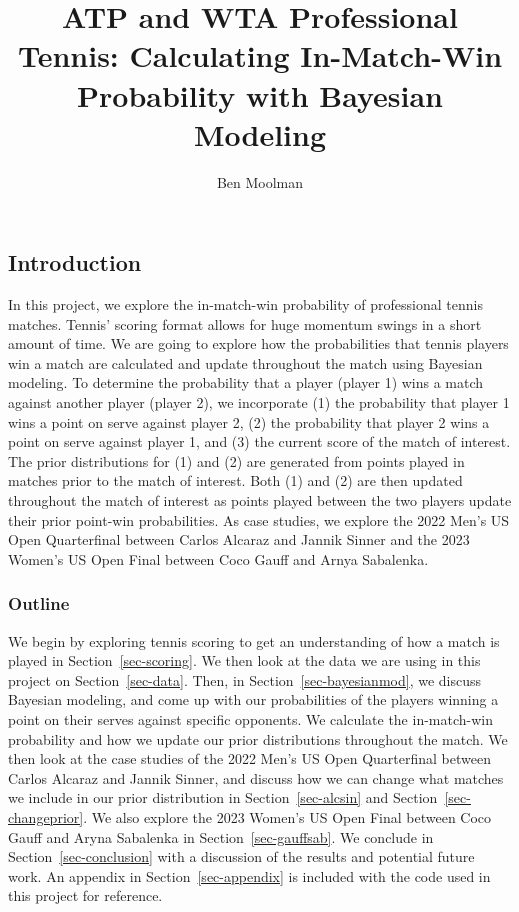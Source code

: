 \documentclass[
  letterpaper,
  DIV=11,
  numbers=noendperiod]{scrartcl}
\title{ATP and WTA Professional Tennis: Calculating In-Match-Win
Probability with Bayesian Modeling}
\author{Ben Moolman}
\date{}
\renewcommand*\contentsname{Table of contents}
\newcommand\contentsname{Table of contents}
\begin{document}
\maketitle

\renewcommand*\contentsname{Table of contents}
{
\hypersetup{linkcolor=}
\setcounter{tocdepth}{3}
\tableofcontents
}
\linespread{0.9}

\linespread{2}

\subsection{Introduction}\label{introduction}

In this project, we explore the in-match-win probability of professional
tennis matches. Tennis' scoring format allows for huge momentum swings
in a short amount of time. We are going to explore how the probabilities
that tennis players win a match are calculated and update throughout the
match using Bayesian modeling. To determine the probability that a
player (player 1) wins a match against another player (player 2), we
incorporate (1) the probability that player 1 wins a point on serve
against player 2, (2) the probability that player 2 wins a point on
serve against player 1, and (3) the current score of the match of
interest. The prior distributions for (1) and (2) are generated from
points played in matches prior to the match of interest. Both (1) and
(2) are then updated throughout the match of interest as points played
between the two players update their prior point-win probabilities. As
case studies, we explore the 2022 Men's US Open Quarterfinal between
Carlos Alcaraz and Jannik Sinner and the 2023 Women's US Open Final
between Coco Gauff and Arnya Sabalenka.

\subsubsection{Outline}\label{outline}

We begin by exploring tennis scoring to get an understanding of how a
match is played in Section~\ref{sec-scoring}. We then look at the data
we are using in this project on Section~\ref{sec-data}. Then, in
Section~\ref{sec-bayesianmod}, we discuss Bayesian modeling, and come up
with our probabilities of the players winning a point on their serves
against specific opponents. We calculate the in-match-win probability
and how we update our prior distributions throughout the match. We then
look at the case studies of the 2022 Men's US Open Quarterfinal between
Carlos Alcaraz and Jannik Sinner, and discuss how we can change what
matches we include in our prior distribution in Section~\ref{sec-alcsin}
and Section~\ref{sec-changeprior}. We also explore the 2023 Women's US
Open Final between Coco Gauff and Aryna Sabalenka in
Section~\ref{sec-gauffsab}. We conclude in Section~\ref{sec-conclusion}
with a discussion of the results and potential future work. An appendix
in Section~\ref{sec-appendix} is included with the code used in this
project for reference.
\end{document}
